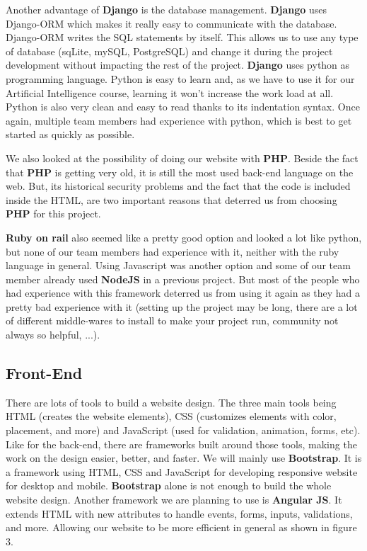 Another advantage of \textbf{Django} is the database management. \textbf{Django} uses Django-ORM which makes it really easy to communicate with the database. Django-ORM writes the SQL statements by itself. This allows us to use any type of database (sqLite, mySQL, PostgreSQL) and change it during the project development without impacting the rest of the project.
\textbf{Django} uses python as programming language. Python is easy to learn and, as we have to use it for our Artificial Intelligence course, learning it won't increase the work load at all.
Python is also very clean and easy to read thanks to its indentation syntax. Once again, multiple team members had experience with python, which is best to get started as quickly as possible.\newline

We also looked at the possibility of doing our website with \textbf{PHP}. Beside the fact that \textbf{PHP} is getting very old, it is still the most used back-end language on the web. But, its historical security problems and the fact that the code is included inside the HTML, are two important reasons that deterred us from choosing \textbf{PHP} for this project.\newline

\textbf{Ruby on rail} also seemed like a pretty good option and looked a lot like python, but none of our team members had experience with it, neither with the ruby language in general. Using Javascript was another option and some of our team member already used \textbf{NodeJS} in a previous project. But most of the people who had experience with this framework deterred us from using it again as they had a pretty bad experience with it (setting up the project may be long, there are a lot of different middle-wares to install to make your project run, community not always so helpful, ...).

\subsection{Front-End}

There are lots of tools to build a website design. The three main tools being HTML (creates the website elements), CSS (customizes elements with color, placement, and more) and JavaScript (used for validation, animation, forms, etc). Like for the back-end, there are frameworks built around those tools, making the work on the design easier, better, and faster. We will mainly use \textbf{Bootstrap}. It is a framework using HTML, CSS and JavaScript for developing responsive website for desktop and mobile. \textbf{Bootstrap} alone is not enough to build the whole website design. Another framework we are planning to use is \textbf{Angular JS}. It extends HTML with new attributes to handle events, forms, inputs, validations, and more. Allowing our website to be more efficient in general as shown in figure 3. \newline

